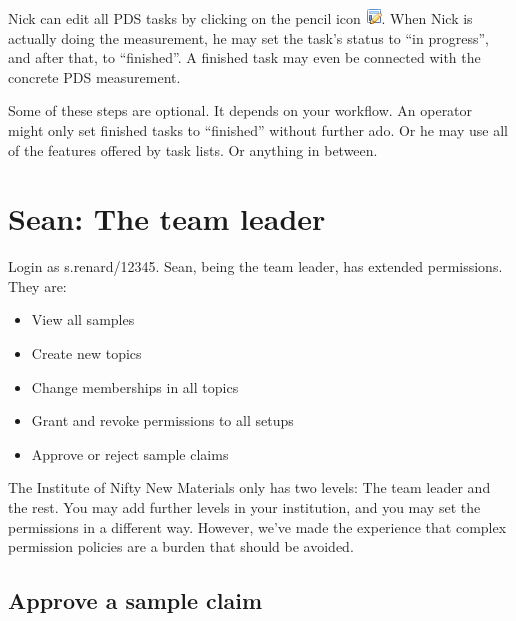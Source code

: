 \documentclass[a4paper,11pt,english]{sphinxmanual}
\begin{document}
Nick can edit all PDS tasks by clicking on the pencil icon \includegraphics{layout_edit.png}.
When Nick is actually doing the measurement, he may set the task's status to
“in progress”, and after that, to “finished”.  A finished task may even be
connected with the concrete PDS measurement.

Some of these steps are optional.  It depends on your workflow.  An operator
might only set finished tasks to “finished” without further ado.  Or he may use
all of the features offered by task lists.  Or anything in between.


\section{Sean: The team leader}
\label{demo:sean-the-team-leader}
Login as s.renard/12345.  Sean, being the team leader, has extended
permissions.  They are:
\begin{itemize}
\item {} 
View all samples

\item {} 
Create new topics

\item {} 
Change memberships in all topics

\item {} 
Grant and revoke permissions to all setups

\item {} 
Approve or reject sample claims

\end{itemize}

The Institute of Nifty New Materials only has two levels: The team leader and
the rest.  You may add further levels in your institution, and you may set the
permissions in a different way.  However, we've made the experience that
complex permission policies are a burden that should be avoided.


\subsection{Approve a sample claim}
\label{demo:approve-a-sample-claim}\label{demo:index-20}
{\hfill{}}
\end{document}
